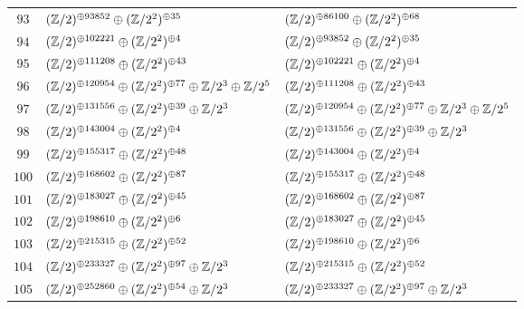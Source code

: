 \begin{supertabular}{|c|p{5.5cm}|p{5.5cm}|}
$93$%
&$(\mathbb{Z}/2)^{\oplus93852}\oplus(\mathbb{Z}/2^{2})^{\oplus35}$%
&$(\mathbb{Z}/2)^{\oplus86100}\oplus(\mathbb{Z}/2^{2})^{\oplus68}$\\

$94$%
&$(\mathbb{Z}/2)^{\oplus102221}\oplus(\mathbb{Z}/2^{2})^{\oplus4}$%
&$(\mathbb{Z}/2)^{\oplus93852}\oplus(\mathbb{Z}/2^{2})^{\oplus35}$\\

$95$%
&$(\mathbb{Z}/2)^{\oplus111208}\oplus(\mathbb{Z}/2^{2})^{\oplus43}$%
&$(\mathbb{Z}/2)^{\oplus102221}\oplus(\mathbb{Z}/2^{2})^{\oplus4}$\\

$96$%
&$(\mathbb{Z}/2)^{\oplus120954}\oplus(\mathbb{Z}/2^{2})^{\oplus77}\oplus\mathbb{Z}/2^{3}\oplus\mathbb{Z}/2^{5}$%
&$(\mathbb{Z}/2)^{\oplus111208}\oplus(\mathbb{Z}/2^{2})^{\oplus43}$\\

$97$%
&$(\mathbb{Z}/2)^{\oplus131556}\oplus(\mathbb{Z}/2^{2})^{\oplus39}\oplus\mathbb{Z}/2^{3}$%
&$(\mathbb{Z}/2)^{\oplus120954}\oplus(\mathbb{Z}/2^{2})^{\oplus77}\oplus\mathbb{Z}/2^{3}\oplus\mathbb{Z}/2^{5}$\\

$98$%
&$(\mathbb{Z}/2)^{\oplus143004}\oplus(\mathbb{Z}/2^{2})^{\oplus4}$%
&$(\mathbb{Z}/2)^{\oplus131556}\oplus(\mathbb{Z}/2^{2})^{\oplus39}\oplus\mathbb{Z}/2^{3}$\\

$99$%
&$(\mathbb{Z}/2)^{\oplus155317}\oplus(\mathbb{Z}/2^{2})^{\oplus48}$%
&$(\mathbb{Z}/2)^{\oplus143004}\oplus(\mathbb{Z}/2^{2})^{\oplus4}$\\

$100$%
&$(\mathbb{Z}/2)^{\oplus168602}\oplus(\mathbb{Z}/2^{2})^{\oplus87}$%
&$(\mathbb{Z}/2)^{\oplus155317}\oplus(\mathbb{Z}/2^{2})^{\oplus48}$\\

$101$%
&$(\mathbb{Z}/2)^{\oplus183027}\oplus(\mathbb{Z}/2^{2})^{\oplus45}$%
&$(\mathbb{Z}/2)^{\oplus168602}\oplus(\mathbb{Z}/2^{2})^{\oplus87}$\\

$102$%
&$(\mathbb{Z}/2)^{\oplus198610}\oplus(\mathbb{Z}/2^{2})^{\oplus6}$%
&$(\mathbb{Z}/2)^{\oplus183027}\oplus(\mathbb{Z}/2^{2})^{\oplus45}$\\

$103$%
&$(\mathbb{Z}/2)^{\oplus215315}\oplus(\mathbb{Z}/2^{2})^{\oplus52}$%
&$(\mathbb{Z}/2)^{\oplus198610}\oplus(\mathbb{Z}/2^{2})^{\oplus6}$\\

$104$%
&$(\mathbb{Z}/2)^{\oplus233327}\oplus(\mathbb{Z}/2^{2})^{\oplus97}\oplus\mathbb{Z}/2^{3}$%
&$(\mathbb{Z}/2)^{\oplus215315}\oplus(\mathbb{Z}/2^{2})^{\oplus52}$\\

$105$%
&$(\mathbb{Z}/2)^{\oplus252860}\oplus(\mathbb{Z}/2^{2})^{\oplus54}\oplus\mathbb{Z}/2^{3}$%
&$(\mathbb{Z}/2)^{\oplus233327}\oplus(\mathbb{Z}/2^{2})^{\oplus97}\oplus\mathbb{Z}/2^{3}$\\


\end{supertabular}
